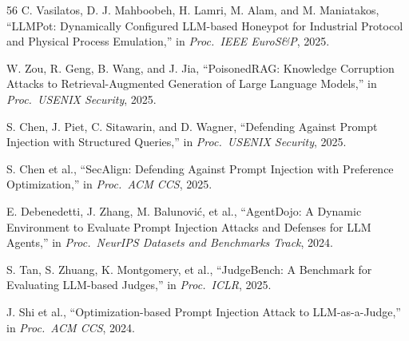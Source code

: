 \begin{thebibliography}{56}
 C. Vasilatos, D. J. Mahboobeh, H. Lamri, M. Alam, and M. Maniatakos, ``LLMPot: Dynamically Configured LLM-based Honeypot for Industrial Protocol and Physical Process Emulation,'' in \emph{Proc.\ IEEE EuroS\&P}, 2025.

 W. Zou, R. Geng, B. Wang, and J. Jia, ``PoisonedRAG: Knowledge Corruption Attacks to Retrieval-Augmented Generation of Large Language Models,'' in \emph{Proc.\ USENIX Security}, 2025.

 S. Chen, J. Piet, C. Sitawarin, and D. Wagner, ``Defending Against Prompt Injection with Structured Queries,'' in \emph{Proc.\ USENIX Security}, 2025.

 S. Chen et al., ``SecAlign: Defending Against Prompt Injection with Preference Optimization,'' in \emph{Proc.\ ACM CCS}, 2025.

 E. Debenedetti, J. Zhang, M. Balunovi\'c, et al., ``AgentDojo: A Dynamic Environment to Evaluate Prompt Injection Attacks and Defenses for LLM Agents,'' in \emph{Proc.\ NeurIPS Datasets and Benchmarks Track}, 2024.

 S. Tan, S. Zhuang, K. Montgomery, et al., ``JudgeBench: A Benchmark for Evaluating LLM-based Judges,'' in \emph{Proc.\ ICLR}, 2025.

 J. Shi et al., ``Optimization-based Prompt Injection Attack to LLM-as-a-Judge,'' in \emph{Proc.\ ACM CCS}, 2024.

\end{thebibliography}
